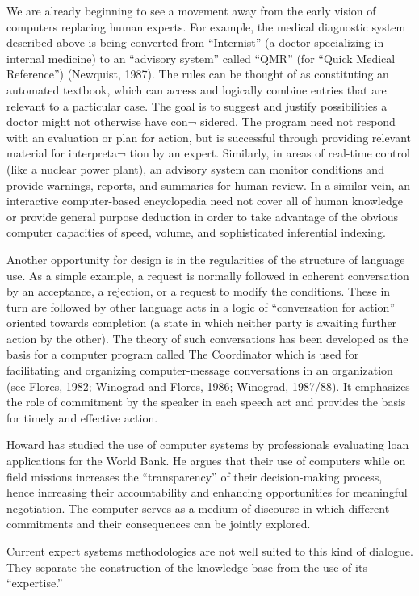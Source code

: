 \documentclass[12pt]{article}
\begin{document}
We are already beginning to see a movement away from the early vision of computers replacing human experts. For example, the medical diagnostic system described above is being converted from ``Internist'' (a doctor specializing in internal medicine) to an ``advisory system'' called ``QMR'' (for ``Quick Medical Reference'') (Newquist, 1987). The rules can be thought of as constituting an automated textbook, which can access and logically combine entries that are relevant to a particular case. The goal is to suggest and justify possibilities a doctor might not otherwise have con¬ sidered. The program need not respond with an evaluation or plan for action, but is successful through providing relevant material for interpreta¬ tion by an expert. Similarly, in areas of real-time control (like a nuclear power plant), an advisory system can monitor conditions and provide warnings, reports, and summaries for human review. In a similar vein, an interactive computer-based encyclopedia need not cover all of human knowledge or provide general purpose deduction in order to take advantage of the obvious computer capacities of speed, volume, and sophisticated inferential indexing.

Another opportunity for design is in the regularities of the structure of language use. As a simple example, a request is normally followed in coherent conversation by an acceptance, a rejection, or a request to modify the conditions. These in turn are followed by other language acts in a logic of ``conversation for action'' oriented towards completion (a state in which neither party is awaiting further action by the other). The theory of such conversations has been developed as the basis for a computer program called The Coordinator which is used for facilitating and organizing computer-message conversations in an organization (see Flores, 1982; Winograd and Flores, 1986; Winograd, 1987/88). It emphasizes the role of commitment by the speaker in each speech act and provides the basis for timely and effective action.

Howard has studied the use of computer systems by professionals evaluating loan applications for the World Bank. He argues that their use of computers while on field missions increases the ``transparency'' of their decision-making process, hence increasing their accountability and enhancing opportunities for meaningful negotiation. The computer serves as a medium of discourse in which different commitments and their consequences can be jointly explored.

Current expert systems methodologies are not well suited to this kind of dialogue. They separate the construction of the knowledge base from the use of its ``expertise.''
\end{document}
